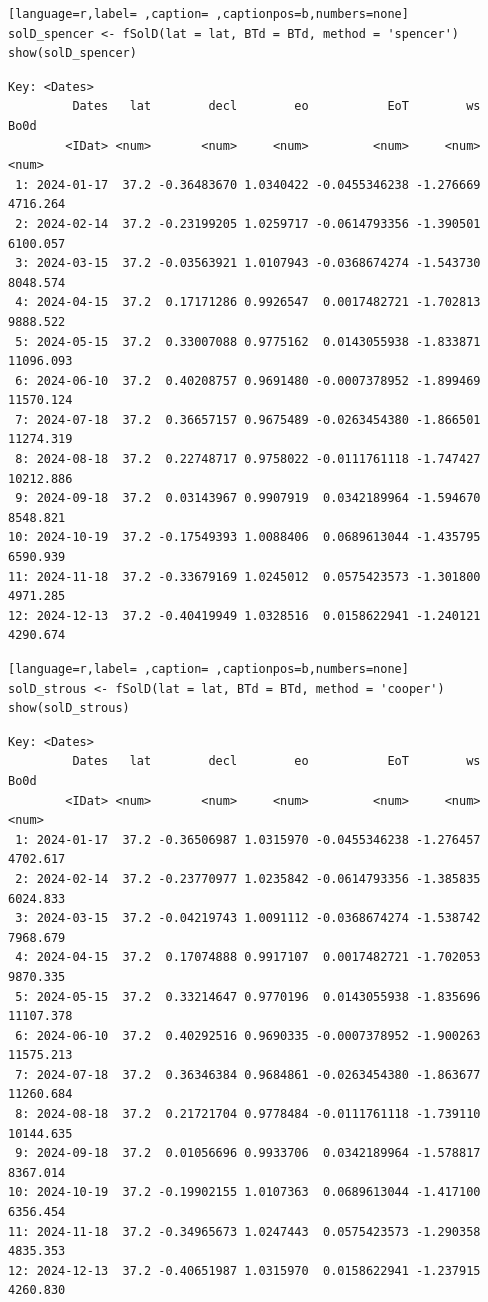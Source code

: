 \begin{lstlisting}[language=r,label= ,caption= ,captionpos=b,numbers=none]
solD_spencer <- fSolD(lat = lat, BTd = BTd, method = 'spencer')
show(solD_spencer)
\end{lstlisting}

\begin{verbatim}
Key: <Dates>
         Dates   lat        decl        eo           EoT        ws      Bo0d
        <IDat> <num>       <num>     <num>         <num>     <num>     <num>
 1: 2024-01-17  37.2 -0.36483670 1.0340422 -0.0455346238 -1.276669  4716.264
 2: 2024-02-14  37.2 -0.23199205 1.0259717 -0.0614793356 -1.390501  6100.057
 3: 2024-03-15  37.2 -0.03563921 1.0107943 -0.0368674274 -1.543730  8048.574
 4: 2024-04-15  37.2  0.17171286 0.9926547  0.0017482721 -1.702813  9888.522
 5: 2024-05-15  37.2  0.33007088 0.9775162  0.0143055938 -1.833871 11096.093
 6: 2024-06-10  37.2  0.40208757 0.9691480 -0.0007378952 -1.899469 11570.124
 7: 2024-07-18  37.2  0.36657157 0.9675489 -0.0263454380 -1.866501 11274.319
 8: 2024-08-18  37.2  0.22748717 0.9758022 -0.0111761118 -1.747427 10212.886
 9: 2024-09-18  37.2  0.03143967 0.9907919  0.0342189964 -1.594670  8548.821
10: 2024-10-19  37.2 -0.17549393 1.0088406  0.0689613044 -1.435795  6590.939
11: 2024-11-18  37.2 -0.33679169 1.0245012  0.0575423573 -1.301800  4971.285
12: 2024-12-13  37.2 -0.40419949 1.0328516  0.0158622941 -1.240121  4290.674
\end{verbatim}

\begin{lstlisting}[language=r,label= ,caption= ,captionpos=b,numbers=none]
solD_strous <- fSolD(lat = lat, BTd = BTd, method = 'cooper')
show(solD_strous)
\end{lstlisting}

\begin{verbatim}
Key: <Dates>
         Dates   lat        decl        eo           EoT        ws      Bo0d
        <IDat> <num>       <num>     <num>         <num>     <num>     <num>
 1: 2024-01-17  37.2 -0.36506987 1.0315970 -0.0455346238 -1.276457  4702.617
 2: 2024-02-14  37.2 -0.23770977 1.0235842 -0.0614793356 -1.385835  6024.833
 3: 2024-03-15  37.2 -0.04219743 1.0091112 -0.0368674274 -1.538742  7968.679
 4: 2024-04-15  37.2  0.17074888 0.9917107  0.0017482721 -1.702053  9870.335
 5: 2024-05-15  37.2  0.33214647 0.9770196  0.0143055938 -1.835696 11107.378
 6: 2024-06-10  37.2  0.40292516 0.9690335 -0.0007378952 -1.900263 11575.213
 7: 2024-07-18  37.2  0.36346384 0.9684861 -0.0263454380 -1.863677 11260.684
 8: 2024-08-18  37.2  0.21721704 0.9778484 -0.0111761118 -1.739110 10144.635
 9: 2024-09-18  37.2  0.01056696 0.9933706  0.0342189964 -1.578817  8367.014
10: 2024-10-19  37.2 -0.19902155 1.0107363  0.0689613044 -1.417100  6356.454
11: 2024-11-18  37.2 -0.34965673 1.0247443  0.0575423573 -1.290358  4835.353
12: 2024-12-13  37.2 -0.40651987 1.0315970  0.0158622941 -1.237915  4260.830
\end{verbatim}

